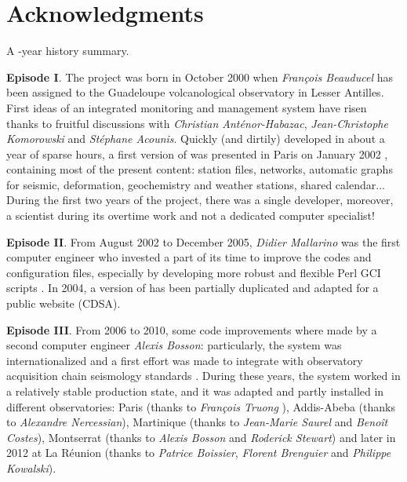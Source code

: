 
\chapter{Acknowledgments}


A \hspace{-12pt}-year history summary.

\textbf{Episode I}. The \webobs project was born in October 2000 when \textit{François Beauducel} has been assigned to the Guadeloupe volcanological observatory in Lesser Antilles. First ideas of an integrated monitoring and management system have risen thanks to fruitful discussions with \textit{Christian Anténor-Habazac}, \textit{Jean-Christophe Komorowski} and \textit{Stéphane Acounis}. Quickly (and dirtily) developed in about a year of sparse hours, a first version of \webobs was presented in Paris on January 2002 \citep{beauducel2002qes}, containing most of the present content: station files, networks, automatic graphs for seismic, deformation, geochemistry and weather stations, shared calendar... During the first two years of the project, there was a single developer, moreover, a scientist during its overtime work and not a dedicated computer specialist!

\textbf{Episode II}. From August 2002 to December 2005, \textit{Didier Mallarino} was the first computer engineer who invested a part of its time to improve the codes and configuration files, especially by developing more robust and flexible Perl GCI scripts \citep{beauducel2004webovs,beauducel2005wim,beauducel2006sov}. In 2004, a version of \webobs has been partially duplicated and adapted for a public website (CDSA).

\textbf{Episode III}. From 2006 to 2010, some code improvements where made by a second computer engineer \textit{Alexis Bosson}: particularly, the system was internationalized and a first effort was made to integrate \webobs with observatory acquisition chain seismology standards \citep{beauducel2010webobs}. During these years, the system worked in a relatively stable production state, and it was adapted and partly installed in different observatories: Paris (thanks to \textit{François Truong} \citep{truong2009magis}), Addis-Abeba (thanks to \textit{Alexandre Nercessian}), Martinique (thanks to \textit{Jean-Marie Saurel} and \textit{Benoît Costes}), Montserrat (thanks to \textit{Alexis Bosson} and \textit{Roderick Stewart}) and later in 2012 at La Réunion (thanks to \textit{Patrice Boissier}, \textit{Florent Brenguier} and \textit{Philippe Kowalski}).


